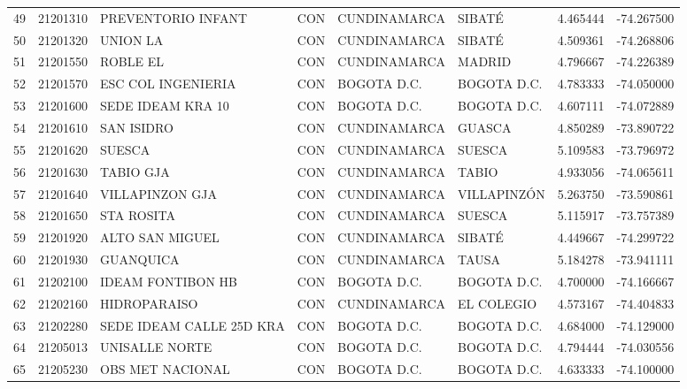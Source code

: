 \documentclass[11pt]{article}
\begin{document}
\begin{table}
\begin{tabular}{lrllllrr}
49  &  21201310 &        PREVENTORIO INFANT &  CON &  CUNDINAMARCA &            SIBATÉ &  4.465444 & -74.267500 \\
50  &  21201320 &                 UNION LA  &  CON &  CUNDINAMARCA &            SIBATÉ &  4.509361 & -74.268806 \\
51  &  21201550 &                 ROBLE EL  &  CON &  CUNDINAMARCA &            MADRID &  4.796667 & -74.226389 \\
52  &  21201570 &        ESC COL INGENIERIA &  CON &   BOGOTA D.C. &       BOGOTA D.C. &  4.783333 & -74.050000 \\
53  &  21201600 &         SEDE IDEAM KRA 10 &  CON &   BOGOTA D.C. &       BOGOTA D.C. &  4.607111 & -74.072889 \\
54  &  21201610 &               SAN ISIDRO  &  CON &  CUNDINAMARCA &            GUASCA &  4.850289 & -73.890722 \\
55  &  21201620 &                SUESCA     &  CON &  CUNDINAMARCA &            SUESCA &  5.109583 & -73.796972 \\
56  &  21201630 &                TABIO GJA  &  CON &  CUNDINAMARCA &             TABIO &  4.933056 & -74.065611 \\
57  &  21201640 &           VILLAPINZON GJA &  CON &  CUNDINAMARCA &       VILLAPINZÓN &  5.263750 & -73.590861 \\
58  &  21201650 &               STA ROSITA  &  CON &  CUNDINAMARCA &            SUESCA &  5.115917 & -73.757389 \\
59  &  21201920 &           ALTO SAN MIGUEL &  CON &  CUNDINAMARCA &            SIBATÉ &  4.449667 & -74.299722 \\
60  &  21201930 &                GUANQUICA  &  CON &  CUNDINAMARCA &             TAUSA &  5.184278 & -73.941111 \\
61  &  21202100 &         IDEAM FONTIBON HB &  CON &   BOGOTA D.C. &       BOGOTA D.C. &  4.700000 & -74.166667 \\
62  &  21202160 &             HIDROPARAISO  &  CON &  CUNDINAMARCA &        EL COLEGIO &  4.573167 & -74.404833 \\
63  &  21202280 &  SEDE IDEAM CALLE 25D KRA &  CON &   BOGOTA D.C. &       BOGOTA D.C. &  4.684000 & -74.129000 \\
64  &  21205013 &            UNISALLE NORTE &  CON &   BOGOTA D.C. &       BOGOTA D.C. &  4.794444 & -74.030556 \\
65  &  21205230 &          OBS MET NACIONAL &  CON &   BOGOTA D.C. &       BOGOTA D.C. &  4.633333 & -74.100000 \\

\end{tabular}
\end{table}
\end{document}
